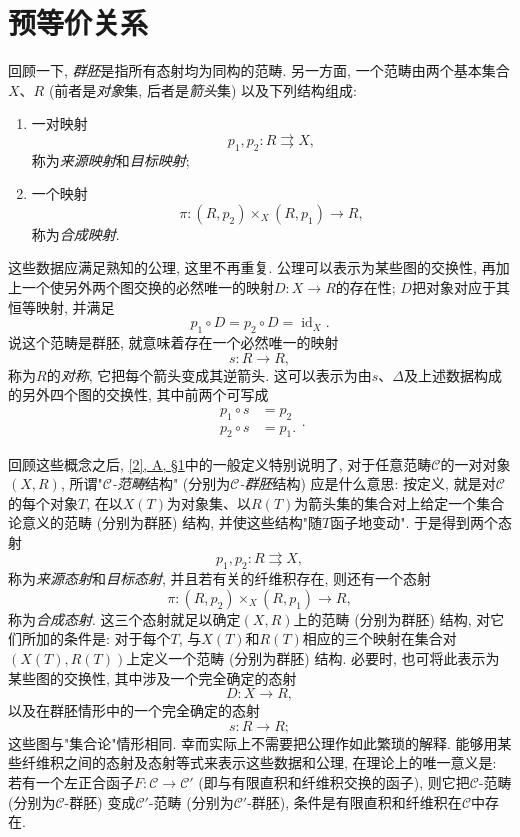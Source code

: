 \chapter{预等价关系}\thispagestyle{fancy}\label{fga3.iii-4}
\par{}回顾一下, \emph{群胚}是指所有态射均为同构的范畴. 另一方面, 一个范畴由两个基本集合\(X\)、\(R\) (前者是\emph{对象}集, 后者是\emph{箭头}集) 以及下列结构组成: 
\begin{enumerate}
    
 \item[i.]一对映射\[         p_1,p_2\colon  R\rightrightarrows  X,\] 称为\emph{来源映射}和\emph{目标映射};

    
 \item[ii.]一个映射\[         \pi \colon (R,p_2)\times _X(R,p_1) \to  R,\] 称为\emph{合成映射}.

  
\end{enumerate} 这些数据应满足熟知的公理, 这里不再重复. 公理可以表示为某些图的交换性, 再加上一个使另外两个图交换的必然唯一的映射\(D\colon  X\to  R\)的存在性; \(D\)把对象对应于其恒等映射, 并满足\[     p_1\circ  D = p_2\circ  D = \operatorname {id}_X.\] 说这个范畴是群胚, 就意味着存在一个必然唯一的映射\[     s\colon  R\to  R,\] 称为\(R\)的\emph{对称}, 它把每个箭头变成其逆箭头. 这可以表示为由\(s\)、\(\Delta \)及上述数据构成的另外四个图的交换性, 其中前两个可写成\[     
\begin {aligned}       p_1\circ  s &= p_2     \\p_2\circ  s &= p_1.     
\end {aligned}.\]
\par{}回顾这些概念之后, \hyperref[fga3.ii-a.1]{[2], A, §1}中的一般定义特别说明了, 对于任意范畴\(\mathcal {C}\)的一对对象\((X,R)\), 所谓"\emph{\(\mathcal {C}\)-范畴}结构" (分别为\emph{\(\mathcal {C}\)-群胚}结构) 应是什么意思: 按定义, 就是对\(\mathcal {C}\)的每个对象\(T\), 在以\(X(T)\)为对象集、以\(R(T)\)为箭头集的集合对上给定一个集合论意义的范畴 (分别为群胚) 结构, 并使这些结构"随\(T\)函子地变动". 于是得到两个态射\[     p_1,p_2\colon  R\rightrightarrows  X,\] 称为\emph{来源态射}和\emph{目标态射}, 并且若有关的纤维积存在, 则还有一个态射\[     \pi \colon  (R,p_2)\times _X(R,p_1) \to  R,\] 称为\emph{合成态射}. 这三个态射就足以确定\((X,R)\)上的范畴 (分别为群胚) 结构, 对它们所加的条件是: 对于每个\(T\), 与\(X(T)\)和\(R(T)\)相应的三个映射在集合对\((X(T),R(T))\)上定义一个范畴 (分别为群胚) 结构. 必要时, 也可将此表示为某些图的交换性, 其中涉及一个完全确定的态射\[     D\colon  X\to  R,\] 以及在群胚情形中的一个完全确定的态射\[     s\colon  R\to  R;\] 这些图与"集合论"情形相同. 幸而实际上不需要把公理作如此繁琐的解释. 能够用某些纤维积之间的态射及态射等式来表示这些数据和公理, 在理论上的唯一意义是: 若有一个左正合函子\(F\colon \mathcal {C}\to \mathcal {C}'\) (即与有限直积和纤维积交换的函子), 则它把\(\mathcal {C}\)-范畴 (分别为\(\mathcal {C}\)-群胚) 变成\(\mathcal {C}'\)-范畴 (分别为\(\mathcal {C}'\)-群胚), 条件是有限直积和纤维积在\(\mathcal {C}\)中存在.
